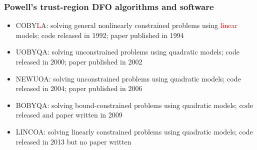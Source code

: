 \documentclass[slidestop,mathserif,xcolor=dvipsnames]{beamer}
\newcommand{\blue}[1]{\textcolor{blue}{#1}}
\newcommand{\red}[1]{\textcolor{red}{#1}}
\begin{document}
\begin{frame}
  \frametitle{Powell's trust-region DFO algorithms and software}

      \vspace{1ex}
      \begin{itemize}
          \item  COBY\red{L}A: solving general nonlinearly constrained problems using \red{linear} models; code released in 1992; paper published in 1994
      \vspace{1ex}

    \item  UOBYQA: solving unconstrained problems using quadratic models; code released in 2000; paper published in 2002
      \vspace{1ex}

    \item  NEWUOA: solving unconstrained problems using quadratic models; code released in 2004; paper published in 2006
      \vspace{1ex}

    \item  BOBYQA:
       solving bound-constrained problems using
       quadratic models; code released and paper written in 2009

      \vspace{1ex}
     \item  LINCOA:
       solving linearly constrained problems using
       quadratic models; code released in 2013 but no paper written

  \end{itemize}
\end{frame}

\end{document}
